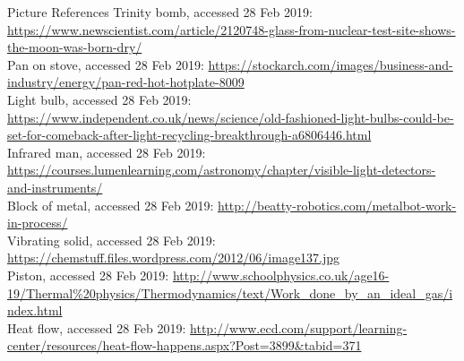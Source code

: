 \documentclass{beamer}
\begin{document}
\begin{frame}{Picture References}
\tiny
Trinity bomb, accessed 28 Feb 2019: \href{https://www.newscientist.com/article/2120748-glass-from-nuclear-test-site-shows-the-moon-was-born-dry/}{https://www.newscientist.com/article/2120748-glass-from-nuclear-test-site-shows-the-moon-was-born-dry/}\\
Pan on stove, accessed 28 Feb 2019: \href{https://stockarch.com/images/business-and-industry/energy/pan-red-hot-hotplate-8009}{https://stockarch.com/images/business-and-industry/energy/pan-red-hot-hotplate-8009}\\
Light bulb, accessed 28 Feb 2019: \href{https://www.independent.co.uk/news/science/old-fashioned-light-bulbs-could-be-set-for-comeback-after-light-recycling-breakthrough-a6806446.html}{https://www.independent.co.uk/news/science/old-fashioned-light-bulbs-could-be-set-for-comeback-after-light-recycling-breakthrough-a6806446.html}\\
Infrared man, accessed 28 Feb 2019: \href{https://courses.lumenlearning.com/astronomy/chapter/visible-light-detectors-and-instruments/}{https://courses.lumenlearning.com/astronomy/chapter/visible-light-detectors-and-instruments/}\\
Block of metal, accessed 28 Feb 2019: \href{http://beatty-robotics.com/metalbot-work-in-process/}{http://beatty-robotics.com/metalbot-work-in-process/}\\
Vibrating solid, accessed 28 Feb 2019: \href{https://chemstuff.files.wordpress.com/2012/06/image137.jpg}{https://chemstuff.files.wordpress.com/2012/06/image137.jpg}\\
Piston, accessed 28 Feb 2019: \href{http://www.schoolphysics.co.uk/age16-19/Thermal\%20physics/Thermodynamics/text/Work_done_by_an_ideal_gas/index.html}{http://www.schoolphysics.co.uk/age16-19/Thermal\%20physics/Thermodynamics/text/Work\_done\_by\_an\_ideal\_gas/index.html}\\
Heat flow, accessed 28 Feb 2019: \href{http://www.ecd.com/support/learning-center/resources/heat-flow-happens.aspx?Post=3899\&tabid=371}{http://www.ecd.com/support/learning-center/resources/heat-flow-happens.aspx?Post=3899\&tabid=371}
\end{frame}
\end{document}
